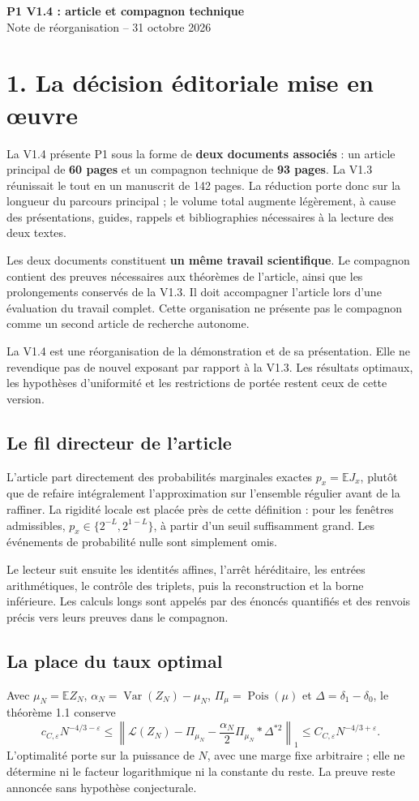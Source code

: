 \documentclass[11pt,a4paper]{article}
\newcommand{\E}{\mathbb E}
\newcommand{\Law}{\mathcal L}
\newcommand{\eps}{\varepsilon}
\begin{document}
{\Large\bfseries\color{accent} P1 V1.4 : article et compagnon technique}\\[4pt]
{\large Note de réorganisation -- 31 octobre 2026}

\section*{1. La décision éditoriale mise en œuvre}
La V1.4 présente P1 sous la forme de \textbf{deux documents associés} :
un article principal de \textbf{60 pages} et un compagnon technique de
\textbf{93 pages}. La V1.3 réunissait le tout en un manuscrit de 142 pages.
La réduction porte donc sur la longueur du parcours principal ; le volume
total augmente légèrement, à cause des présentations, guides, rappels et
bibliographies nécessaires à la lecture des deux textes.

Les deux documents constituent \textbf{un même travail scientifique}.
Le compagnon contient des preuves nécessaires aux théorèmes de l'article,
ainsi que les prolongements conservés de la V1.3. Il doit accompagner
l'article lors d'une évaluation du travail complet. Cette organisation
ne présente pas le compagnon comme un second article de recherche autonome.

La V1.4 est une réorganisation de la démonstration et de sa présentation.
Elle ne revendique pas de nouvel exposant par rapport à la V1.3.
Les résultats optimaux, les hypothèses d'uniformité et les restrictions
de portée restent ceux de cette version.

\subsection*{Le fil directeur de l'article}
L'article part directement des probabilités marginales exactes
\(p_x=\E J_x\), plutôt que de refaire intégralement l'approximation sur
l'ensemble régulier avant de la raffiner. La rigidité locale est placée
près de cette définition : pour les fenêtres admissibles,
\(p_x\in\{2^{-L},2^{1-L}\}\), à partir d'un seuil suffisamment grand.
Les événements de probabilité nulle sont simplement omis.

Le lecteur suit ensuite les identités affines, l'arrêt héréditaire,
les entrées arithmétiques, le contrôle des triplets, puis la reconstruction
et la borne inférieure. Les calculs longs sont appelés par des énoncés
quantifiés et des renvois précis vers leurs preuves dans le compagnon.

\subsection*{La place du taux optimal}
Avec \(\mu_N=\E Z_N\), \(\alpha_N=\operatorname{Var}(Z_N)-\mu_N\),
\(\Pi_\mu=\operatorname{Pois}(\mu)\) et
\(\Delta=\delta_1-\delta_0\), le théorème 1.1 conserve
\[
 c_{C,\eps}N^{-4/3-\eps}
 \le \left\|\Law(Z_N)-\Pi_{\mu_N}
 -\frac{\alpha_N}{2}\Pi_{\mu_N}*\Delta^{*2}\right\|_1
 \le C_{C,\eps}N^{-4/3+\eps}.
\]
L'optimalité porte sur la puissance de \(N\), avec une marge fixe
arbitraire ; elle ne détermine ni le facteur logarithmique ni la constante
du reste. La preuve reste annoncée sans hypothèse conjecturale.
\end{document}

